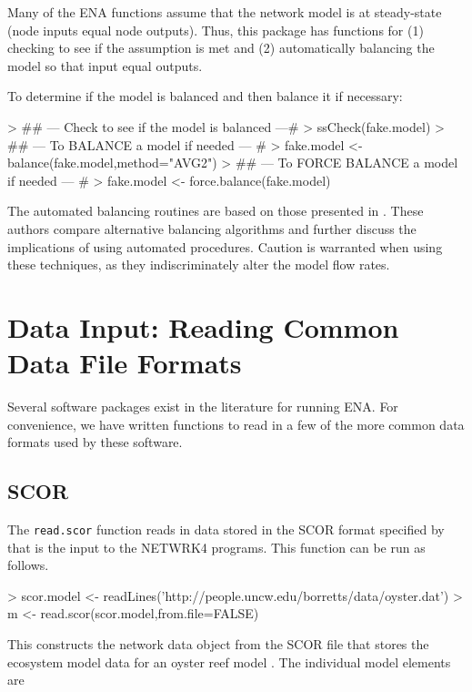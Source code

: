 \documentclass[article]{jss}
\begin{document}
Many of the ENA functions assume that the network model is at
steady-state (node inputs equal node outputs).  Thus, this package has
functions for (1) checking to see if the assumption is met and (2)
automatically balancing the model so that input equal outputs.

To determine if the model is balanced and then balance it if necessary:
\begin{Schunk}
\begin{Sinput}
> ## --- Check to see if the model is balanced ---#
> ssCheck(fake.model)
> ## --- To BALANCE a model if needed --- #
> fake.model <- balance(fake.model,method="AVG2")
> ## --- To FORCE BALANCE a model if needed --- #
> fake.model <- force.balance(fake.model)
\end{Sinput}
\end{Schunk}

The automated balancing routines are based on those presented in
\citet{allesina03}.  These authors compare alternative balancing
algorithms and further discuss the implications of using automated
procedures.  Caution is warranted when using these techniques, as they
indiscriminately alter the model flow rates.

\section{Data Input: Reading Common Data File Formats}
Several software packages exist in the literature for running ENA.  For
convenience, we have written functions to read in a few of the more
common data formats used by these software.

\subsection*{SCOR}
The \texttt{read.scor} function reads in data stored in the SCOR
format specified by \citet{ulanowicz91} that is the input to the
NETWRK4 programs.  This function can be run as follows.

\begin{Schunk}
\begin{Sinput}
> scor.model <- readLines('http://people.uncw.edu/borretts/data/oyster.dat')
> m <- read.scor(scor.model,from.file=FALSE)
\end{Sinput}
\end{Schunk}

This constructs the network data object from the SCOR file that stores
the ecosystem model data for an oyster reef model \citep{dame81}.  The
individual model elements are
\end{document}
